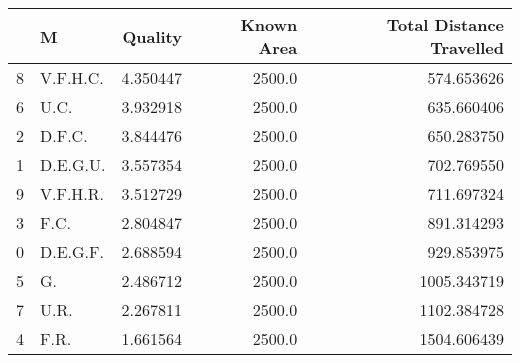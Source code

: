 \begin{tabular}{llrrr}
\toprule
{} &         M &   Quality &  Known Area &  Total Distance Travelled \\
\midrule
8 &  V.F.H.C. &  4.350447 &      2500.0 &                574.653626 \\
6 &      U.C. &  3.932918 &      2500.0 &                635.660406 \\
2 &    D.F.C. &  3.844476 &      2500.0 &                650.283750 \\
1 &  D.E.G.U. &  3.557354 &      2500.0 &                702.769550 \\
9 &  V.F.H.R. &  3.512729 &      2500.0 &                711.697324 \\
3 &      F.C. &  2.804847 &      2500.0 &                891.314293 \\
0 &  D.E.G.F. &  2.688594 &      2500.0 &                929.853975 \\
5 &        G. &  2.486712 &      2500.0 &               1005.343719 \\
7 &      U.R. &  2.267811 &      2500.0 &               1102.384728 \\
4 &      F.R. &  1.661564 &      2500.0 &               1504.606439 \\
\bottomrule
\end{tabular}
